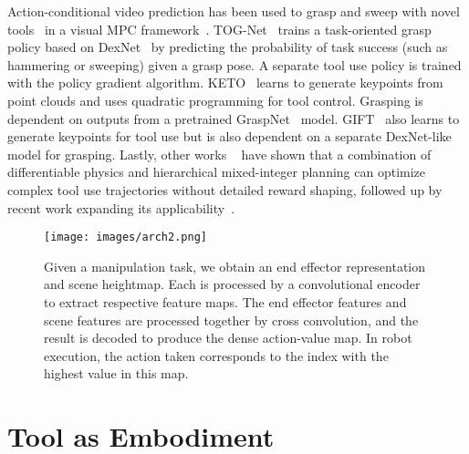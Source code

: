 \documentclass[10pt,twocolumn,letterpaper]{article}
\begin{document}
Action-conditional video prediction has been used to grasp and sweep with novel tools~\cite{xie2019improvisation} in a visual MPC framework~\cite{finn2017deep}.
TOG-Net~\cite{fang2020learning} trains a task-oriented grasp policy based on DexNet~\cite{mahler2017dex} by predicting the probability of task success (such as hammering or sweeping) given a grasp pose.
A separate tool use policy is trained with the policy gradient algorithm. KETO~\cite{qin2020keto} learns to generate keypoints from point clouds and uses quadratic programming for tool control. Grasping is dependent on outputs from a pretrained GraspNet~\cite{mousavian20196} model.
GIFT~\cite{turpin2021gift} also learns to generate keypoints for tool use but is also dependent on a separate DexNet-like model for grasping. Lastly, other works ~\cite{toussaint2018differentiable} have shown that a combination of differentiable physics and hierarchical mixed-integer planning can optimize complex tool use trajectories without detailed reward shaping, followed up by recent work expanding its applicability~\cite{driess2021learning}.


\begin{figure}[t]
  \centering
   \texttt{[image: images/arch2.png]}
   \caption{Given a manipulation task, we obtain an end effector representation and scene heightmap. Each is processed by a convolutional encoder to extract respective feature maps. The end effector features and scene features are processed together by cross convolution, and the result is decoded to produce the dense action-value map. In robot execution, the action taken corresponds to the index with the highest value in this map.}
   \vspace{-10pt}
   \label{fig:arch}
\end{figure}

\section{Tool as Embodiment}
\end{document}
